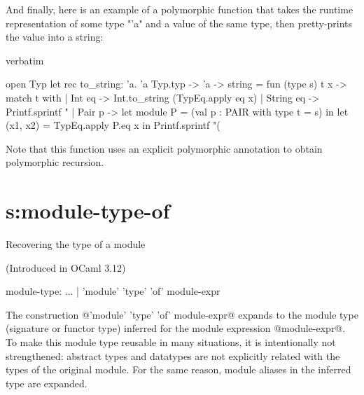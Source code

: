 And finally, here is an example of a polymorphic function that takes the
runtime representation of some type "'a" and a value of the same type,
then pretty-prints the value into a string:

\begin{camlexample}{verbatim}
\begin{caml}
\begin{camlinput}
open Typ
let rec to_string: 'a. 'a Typ.typ -> 'a -> string =
  fun (type s) t x ->
    match t with
    | Int eq -> Int.to_string (TypEq.apply eq x)
    | String eq -> Printf.sprintf "%
    | Pair p ->
        let module P = (val p : PAIR with type t = s) in
        let (x1, x2) = TypEq.apply P.eq x in
        Printf.sprintf "(%
\end{camlinput}
\end{caml}
\end{camlexample}

Note that this function uses an explicit polymorphic annotation to obtain
polymorphic recursion.
\fi

\section{s:module-type-of}{Recovering the type of a module}


(Introduced in OCaml 3.12)

\begin{syntax}
module-type:
     ...
   | 'module' 'type' 'of' module-expr
\end{syntax}

The construction @'module' 'type' 'of' module-expr@ expands to the module type
(signature or functor type) inferred for the module expression @module-expr@.
To make this module type reusable in many situations, it is
intentionally not strengthened: abstract types and datatypes are not
explicitly related with the types of the original module.
For the same reason, module aliases in the inferred type are expanded.

